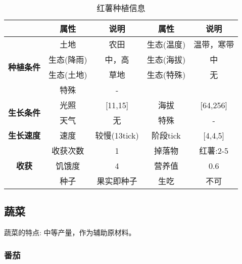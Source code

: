 \begin{table}[H]
    \centering
    \caption{红薯种植信息}
    \label{table:红薯种植信息}
    \setlength{\tabcolsep}{4mm}
    \begin{tabular}{c|cc|cc}
        \toprule
                                           & \textbf{属性} & \textbf{说明}   & \textbf{属性} & \textbf{说明} \\
        \midrule
        \multirow{4}{*}{\textbf{种植条件}} & 土地          & 农田            & 生态(温度)    & 温带，寒带    \\
                                           & 生态(降雨)    & 中，高          & 生态(海拔)    & 中            \\
                                           & 生态(土地)    & 草地            & 生态(特殊)    & 无            \\
                                           & 特殊          & -                                 \\
        \midrule
        \multirow{2}{*}{\textbf{生长条件}} & 光照          & [11,15]         & 海拔          & [64,256]      \\
                                           & 天气          & 无              & 特殊          & -      \\
        \midrule
        \textbf{生长速度}                  & 速度          & 较慢(13tick)       & 阶段tick      & [4,4,5]       \\
        \midrule
        \multirow{3}{*}{\textbf{收获}}     & 收获次数      & 1               & 掉落物        & 红薯:2-5      \\
                                           & 饥饿度        & 4               & 营养值        & 0.6           \\
                                           & 种子          & 果实即种子        & 生吃          & 不可       \\
        \bottomrule
    \end{tabular}
\end{table}

\subsection{蔬菜}

蔬菜的特点: 中等产量，作为辅助原材料。

\subsubsection{番茄}

